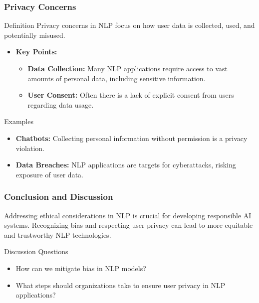 \documentclass[aspectratio=169]{beamer}
\begin{document}
\begin{frame}[fragile]
    \frametitle{Privacy Concerns}
    \begin{block}{Definition}
        Privacy concerns in NLP focus on how user data is collected, used, and potentially misused.
    \end{block}
    
    \begin{itemize}
        \item \textbf{Key Points:}
        \begin{itemize}
            \item \textbf{Data Collection:} Many NLP applications require access to vast amounts of personal data, including sensitive information.
            \item \textbf{User Consent:} Often there is a lack of explicit consent from users regarding data usage.
        \end{itemize}
    \end{itemize}
    
    \begin{block}{Examples}
        \begin{itemize}
            \item \textbf{Chatbots:} Collecting personal information without permission is a privacy violation.
            \item \textbf{Data Breaches:} NLP applications are targets for cyberattacks, risking exposure of user data.
        \end{itemize}
    \end{block}
\end{frame}

\begin{frame}[fragile]
    \frametitle{Conclusion and Discussion}
    Addressing ethical considerations in NLP is crucial for developing responsible AI systems. Recognizing bias and respecting user privacy can lead to more equitable and trustworthy NLP technologies.
    
    \begin{block}{Discussion Questions}
        \begin{itemize}
            \item How can we mitigate bias in NLP models?
            \item What steps should organizations take to ensure user privacy in NLP applications?
        \end{itemize}
    \end{block}
\end{frame}
\end{document}
